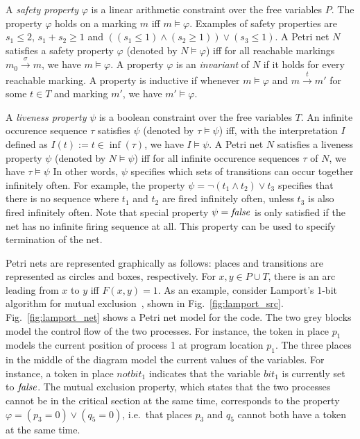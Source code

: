 A \emph{safety property} $\varphi$ is a linear arithmetic constraint over the free variables $P$. 
The property $\varphi$ holds on a marking $m$ iff $m \models \varphi$.
 Examples of safety properties are $s_1 \le 2$, $s_1 + s_2 \ge 1$ and
 $((s_1 \le 1) \land (s_2 \ge 1)) \lor (s_3 \le 1)$.
A Petri net $N$ satisfies a safety property $\varphi$ (denoted by $N \models \varphi$)
iff for all reachable markings $m_0 \xrightarrow{\sigma} m$, we have
$m \models \varphi$.
A property $\varphi$ is an \emph{invariant} of $N$ if it holds for every reachable marking.
A property is inductive if whenever $m\models \varphi$ and $m \xrightarrow{t} m'$ for some $t\in T$
and marking $m'$, we have $m'\models \varphi$.

A \emph{liveness property} $\psi$ is a boolean constraint over the free variables $T$.
An infinite occurence sequence $\tau$ satisfies $\psi$ (denoted by $\tau \models \psi$)
iff, with the interpretation $I$ defined as $I(t) := t \in \inf(\tau)$, we have $I \models \psi$.
A Petri net $N$ satisfies a liveness property $\psi$ (denoted by $N \models \psi$)
iff for all infinite occurence sequences $\tau$ of $N$, we have $\tau \models \psi$
In other words, $\psi$ specifies which sets of transitions can occur
together infinitely often. For example, the property $\psi = \neg (t_1 \land t_2) \lor t_3$
specifies that there is no sequence where $t_1$ and $t_2$ are fired infinitely often, unless
$t_3$ is also fired infinitely often. Note that special property $\psi = \operatorname{\mathit{false}}$ is only
satisfied if the net has no infinite firing sequence at all.
This property can be used to specify termination of the net.



Petri nets are represented graphically as follows: places and transitions
are represented as circles and boxes, respectively. For $x, y \in P \cup T$,
there is an arc leading from $x$ to $y$ if{}f $F(x,y)=1$.
%
As an example, consider Lamport's 1-bit
algorithm for mutual exclusion~\autocite{Lamport86}, shown in
Fig.~\ref{fig:lamport_src}.
Fig.~\ref{fig:lamport_net} shows a Petri net model for the code.
The two grey blocks model the control flow of the two
processes. For instance, the token in place $p_1$ models the current
position of process 1 at program location $p_1$. The three places in the middle of the
diagram model the current values of the variables. For instance, a
token in place $notbit_1$ indicates that the variable $bit_1$ is currently
set to $\operatorname{\mathit{false}}$.
The mutual exclusion property, which states that the two processes cannot be in the
critical section at the same time, corresponds to the property
$\varphi = (p_3 = 0) \lor (q_5 = 0)$, i.e.\ that
places $p_3$ and $q_5$ cannot both have a token at the same time.


\newpage




